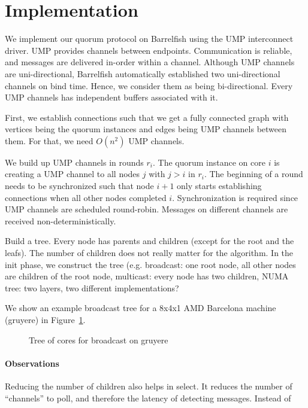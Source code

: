 \documentclass{article}
\begin{document}
\section{Implementation}

We implement our quorum protocol on Barrelfish using the UMP
interconnect driver. UMP provides channels between
endpoints. Communication is reliable, and messages are delivered
in-order within a channel. Although UMP channels are uni-directional,
Barrelfish automatically established two uni-directional channels on
bind time. Hence, we consider them as being bi-directional. Every UMP
channels has independent buffers associated with it.

First, we establish connections such that we get a fully connected
graph with vertices being the quorum instances and edges being UMP
channels between them. For that, we need $O(n^2)$ UMP channels. 

We build up UMP channels in rounds $r_i$. The quorum instance on core
$i$ is creating a UMP channel to all nodes $j$ with $j>i$ in
$r_i$. The beginning of a round needs to be synchronized such that
node $i+1$ only starts establishing connections when all other nodes
completed $i$. Synchronization is required since UMP channels are
scheduled round-robin. Messages on different channels are received
non-deterministically. 

Build a tree. Every node has parents and children (except for the root
and the leafs). The number of children does not really matter for the
algorithm. In the init phase, we construct the tree (e.g. broadcast:
one root node, all other nodes are children of the root node,
multicast: every node has two children, NUMA tree: two layers, two
different implementations?

We show an example broadcast tree for a 8x4x1 AMD Barcelona machine
(gruyere) in Figure~\ref{fig:qrm_tree_gruyere}.

\begin{figure}
  
  \caption{Tree of cores for broadcast on gruyere}
  \label{fig:qrm_tree_gruyere}
\end{figure}

\paragraph{Observations} Reducing the number of children also helps in
select. It reduces the number of ``channels'' to poll, and therefore
the latency of detecting messages. Instead of
\end{document}
